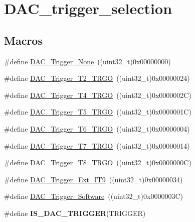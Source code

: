 \hypertarget{group___d_a_c__trigger__selection}{}\section{D\+A\+C\+\_\+trigger\+\_\+selection}
\label{group___d_a_c__trigger__selection}
\subsection*{Macros}
\begin{DoxyCompactItemize}
\item 
\#define \hyperlink{group___d_a_c__trigger__selection_ga7849138e043267668d755390d923e4ba}{D\+A\+C\+\_\+\+Trigger\+\_\+\+None}~((uint32\+\_\+t)0x00000000)
\item 
\#define \hyperlink{group___d_a_c__trigger__selection_ga3bfbff1e03af1fd17a57a43e57420fe6}{D\+A\+C\+\_\+\+Trigger\+\_\+\+T2\+\_\+\+T\+R\+GO}~((uint32\+\_\+t)0x00000024)
\item 
\#define \hyperlink{group___d_a_c__trigger__selection_ga58ccb2de3d22d66ee975152f5edb330a}{D\+A\+C\+\_\+\+Trigger\+\_\+\+T4\+\_\+\+T\+R\+GO}~((uint32\+\_\+t)0x0000002\+C)
\item 
\#define \hyperlink{group___d_a_c__trigger__selection_ga35352cebfd1ae8a3d63e374a5d86a85d}{D\+A\+C\+\_\+\+Trigger\+\_\+\+T5\+\_\+\+T\+R\+GO}~((uint32\+\_\+t)0x0000001\+C)
\item 
\#define \hyperlink{group___d_a_c__trigger__selection_ga083307783678a2f1d3066db57dc84cfe}{D\+A\+C\+\_\+\+Trigger\+\_\+\+T6\+\_\+\+T\+R\+GO}~((uint32\+\_\+t)0x00000004)
\item 
\#define \hyperlink{group___d_a_c__trigger__selection_ga9b92d497746be54af46ae4e9c1fc4a6f}{D\+A\+C\+\_\+\+Trigger\+\_\+\+T7\+\_\+\+T\+R\+GO}~((uint32\+\_\+t)0x00000014)
\item 
\#define \hyperlink{group___d_a_c__trigger__selection_ga756700c6621eadb807e21a16966580a0}{D\+A\+C\+\_\+\+Trigger\+\_\+\+T8\+\_\+\+T\+R\+GO}~((uint32\+\_\+t)0x0000000\+C)
\item 
\#define \hyperlink{group___d_a_c__trigger__selection_ga67c15b2c26246a2304f9db28e25adcc4}{D\+A\+C\+\_\+\+Trigger\+\_\+\+Ext\+\_\+\+I\+T9}~((uint32\+\_\+t)0x00000034)
\item 
\#define \hyperlink{group___d_a_c__trigger__selection_gadef77bb8bbd109232900902402ef637f}{D\+A\+C\+\_\+\+Trigger\+\_\+\+Software}~((uint32\+\_\+t)0x0000003\+C)
\item 
\#define {\bfseries I\+S\+\_\+\+D\+A\+C\+\_\+\+T\+R\+I\+G\+G\+ER}(T\+R\+I\+G\+G\+ER)
\end{DoxyCompactItemize}


